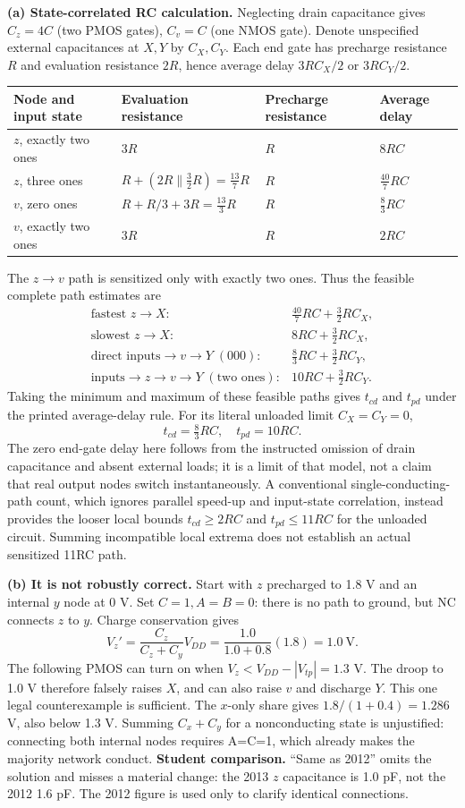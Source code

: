 \documentclass[10pt]{article}
\begin{document}
\textbf{(a) State-correlated RC calculation.} Neglecting drain capacitance gives $C_z=4C$ (two PMOS gates), $C_v=C$ (one NMOS gate). Denote unspecified external capacitances at $X,Y$ by $C_X,C_Y$. Each end gate has precharge resistance $R$ and evaluation resistance $2R$, hence average delay $3RC_X/2$ or $3RC_Y/2$.
\begin{center}\begin{tabular}{llll}\toprule
Node and input state & Evaluation resistance & Precharge resistance & Average delay\\\midrule
$z$, exactly two ones & $3R$ & $R$ & $8RC$\\
$z$, three ones & $R+(2R\parallel\tfrac32R)=\tfrac{13}{7}R$ & $R$ & $\tfrac{40}{7}RC$\\
$v$, zero ones & $R+R/3+3R=\tfrac{13}{3}R$ & $R$ & $\tfrac83RC$\\
$v$, exactly two ones & $3R$ & $R$ & $2RC$\\\bottomrule\end{tabular}\end{center}
The $z\to v$ path is sensitized only with exactly two ones. Thus the feasible complete path estimates are
\[
\begin{array}{ll}
\text{fastest }z\to X:&\tfrac{40}{7}RC+\tfrac32RC_X,\\
\text{slowest }z\to X:&8RC+\tfrac32RC_X,\\
\text{direct inputs}\to v\to Y\;(000):&\tfrac83RC+\tfrac32RC_Y,\\
\text{inputs}\to z\to v\to Y\;(\text{two ones}):&10RC+\tfrac32RC_Y.
\end{array}
\]
Taking the minimum and maximum of these feasible paths gives $t_{cd}$ and $t_{pd}$ under the printed average-delay rule. For its literal unloaded limit $C_X=C_Y=0$,
\[\boxed{t_{cd}=\tfrac83RC,\quad t_{pd}=10RC.}\]
The zero end-gate delay here follows from the instructed omission of drain capacitance and absent external loads; it is a limit of that model, not a claim that real output nodes switch instantaneously. A conventional single-conducting-path count, which ignores parallel speed-up and input-state correlation, instead provides the looser local bounds $t_{cd}\geq2RC$ and $t_{pd}\leq11RC$ for the unloaded circuit. Summing incompatible local extrema does not establish an actual sensitized 11RC path.

\textbf{(b) It is not robustly correct.} Start with $z$ precharged to 1.8 V and an internal $y$ node at 0 V. Set $C=1,A=B=0$: there is no path to ground, but NC connects $z$ to $y$. Charge conservation gives
\[V_z'=\frac{C_z}{C_z+C_y}V_{DD}=\frac{1.0}{1.0+0.8}(1.8)=1.0\ \mathrm V.\]
The following PMOS can turn on when $V_z<V_{DD}-|V_{tp}|=1.3$ V. The droop to 1.0 V therefore falsely raises $X$, and can also raise $v$ and discharge $Y$. This one legal counterexample is sufficient. The $x$-only share gives $1.8/(1+0.4)=1.286$ V, also below 1.3 V. Summing $C_x+C_y$ for a nonconducting state is unjustified: connecting both internal nodes requires A=C=1, which already makes the majority network conduct.
\textbf{Student comparison.} ``Same as 2012'' omits the solution and misses a material change: the 2013 $z$ capacitance is 1.0 pF, not the 2012 1.6 pF. The 2012 figure is used only to clarify identical connections.
\end{document}
